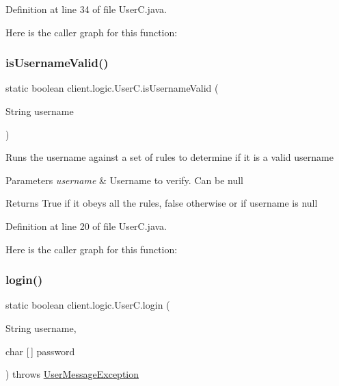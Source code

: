 Definition at line 34 of file User\+C.\+java.

Here is the caller graph for this function\+:
\hypertarget{classclient_1_1logic_1_1_user_c_a62765c4c4912ee02b3ef70f1b9c0fb4e}{}\label{classclient_1_1logic_1_1_user_c_a62765c4c4912ee02b3ef70f1b9c0fb4e} 
\subsubsection{\texorpdfstring{is\+Username\+Valid()}{isUsernameValid()}}
{\footnotesize\ttfamily static boolean client.\+logic.\+User\+C.\+is\+Username\+Valid (\begin{DoxyParamCaption}\item[{String}]{username }\end{DoxyParamCaption})\hspace{0.3cm}{\ttfamily [static]}}

Runs the username against a set of rules to determine if it is a valid username


\begin{DoxyParams}{Parameters}
{\em username} & Username to verify. Can be null \\
\hline
\end{DoxyParams}
\begin{DoxyReturn}{Returns}
True if it obeys all the rules, false otherwise or if username is null 
\end{DoxyReturn}


Definition at line 20 of file User\+C.\+java.

Here is the caller graph for this function\+:
\hypertarget{classclient_1_1logic_1_1_user_c_aa3736b2a54be77a2b631ca49b9980a8c}{}\label{classclient_1_1logic_1_1_user_c_aa3736b2a54be77a2b631ca49b9980a8c} 
\subsubsection{\texorpdfstring{login()}{login()}}
{\footnotesize\ttfamily static boolean client.\+logic.\+User\+C.\+login (\begin{DoxyParamCaption}\item[{String}]{username,  }\item[{char \mbox{[}$\,$\mbox{]}}]{password }\end{DoxyParamCaption}) throws \hyperlink{classpt_1_1up_1_1fe_1_1lpro1613_1_1sharedlib_1_1exceptions_1_1_user_message_exception}{User\+Message\+Exception}\hspace{0.3cm}{\ttfamily [static]}}

